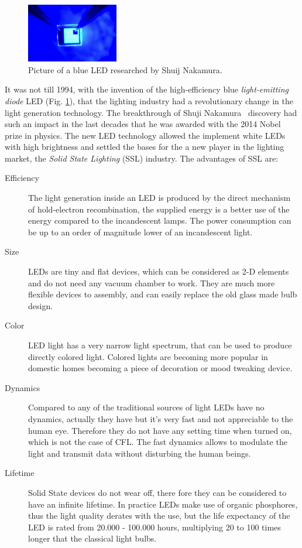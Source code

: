\begin{figure}[!h]
\centering
\includegraphics[width=4cm]{./0_intro/img/10-7-14-nobel-prize-blue-led.jpg}
\caption{Picture of a blue LED researched by Shuij Nakamura.}
\label{fig:blue_LED}
\end{figure}

It was not till 1994, with the invention of the high-efficiency blue \emph{light-emitting diode} LED (Fig. \ref{fig:blue_LED}), that the lighting industry had a revolutionary change in the light generation technology. The breakthrough of Shuji Nakamura~\cite{94Nakamura} discovery had such an impact in the last decades that he was awarded with the 2014 Nobel prize in physics. The new LED technology allowed the implement white LEDs with high brightness and settled the bases for the a new player in the lighting market, the \emph{Solid State Lighting} (SSL) industry.
The advantages of SSL are:
\begin{description}
  \item [Efficiency] The light generation inside an LED is produced by the direct mechanism of hold-electron recombination, the supplied energy is a better use of the energy compared to the incandescent lamps. The power consumption can be up to an order of magnitude lower of an incandescent light.

  \item [Size] LEDs are tiny and flat devices, which can be considered as 2-D elements and do not need any vacuum chamber to work. They are much more flexible devices to assembly, and can easily replace the old glass made bulb design.

  \item [Color] LED light has a very narrow light spectrum, that can be used to produce directly colored light. Colored lights are becoming more popular in domestic homes becoming a piece of decoration or mood tweaking device.

  \item [Dynamics] Compared to any of the traditional sources of light LEDs have no dynamics, actually they have but it's very fast and not appreciable to the human eye. Therefore they do not have any setting time when turned on, which is not the case of CFL. The fast dynamics allows to modulate the light and transmit data without disturbing the human beings.

  \item [Lifetime] Solid State devices do not wear off, there fore they can be considered to have an infinite lifetime. In practice LEDs make use of organic phosphores, thus the light quality derates with the use, but the life expectancy of the LED is rated from 20.000 - 100.000 hours, multiplying 20 to 100 times longer that the classical light bulbs.
\end{description}

